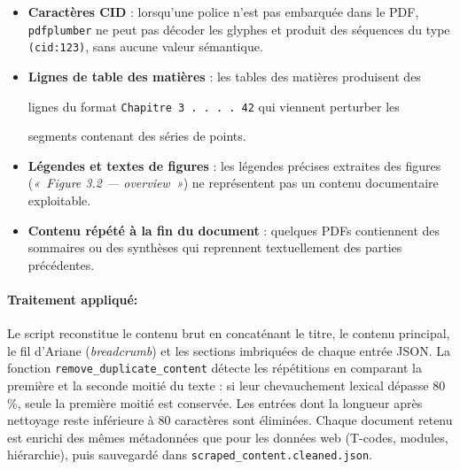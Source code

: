 \begin{tcolorbox}[
  enhanced, breakable,
  colback       = red!3!white,
  colframe      = red!38!black,
  colbacktitle  = red!38!black,
  coltitle      = white,
  fonttitle     = \small\bfseries\sffamily,
  title         = {Problèmes identifiés},
  arc           = 5pt,
  boxrule       = 0.75pt,
  toptitle      = 3.5pt, bottomtitle = 3.5pt,
  left = 8pt, right = 8pt, top = 6pt, bottom = 6pt,
]
\begin{itemize}[
  leftmargin = *,
  label      = {\textcolor{red!45!black}{\small$\blacktriangleright$}},
  itemsep    = 6pt,
  topsep     = 0pt,
  parsep     = 0pt
]

  \item {}\enspace
    \textbf{Caractères CID} : lorsqu'une police n'est pas embarquée dans le PDF,
    \texttt{pdfplumber} ne peut pas décoder les glyphes et produit des séquences
    du type \texttt{(cid:123)}, sans aucune valeur sémantique.

  \item {}\enspace
  \textbf{Lignes de table des matières} : les tables des matières produisent des

    lignes du format \texttt{Chapitre\,3\,.\,.\,.\,.\,42} qui viennent perturber les

    segments contenant des séries de points.

  \item {}\enspace
    \textbf{Légendes et textes de figures} : les légendes précises extraites des figures (\textit{«~Figure 3.2 --- overview~»}) ne représentent pas un contenu documentaire exploitable.

  \item {}\enspace
\textbf{Contenu répété à la fin du document} : quelques PDFs contiennent des sommaires ou des synthèses qui reprennent textuellement des parties précédentes.

\end{itemize}
\end{tcolorbox}

\paragraph{Traitement appliqué:}

Le script reconstitue le contenu brut en concaténant le titre, le contenu principal, le fil d’Ariane (\textit{breadcrumb}) et les sections imbriquées de chaque entrée JSON. La fonction \texttt{remove\_duplicate\_content} détecte les répétitions en comparant la première et la seconde moitié du texte : si leur chevauchement lexical dépasse 80\,\%, seule la première moitié est conservée. Les entrées dont la longueur après nettoyage reste inférieure à 80 caractères sont éliminées. Chaque document retenu est enrichi des mêmes métadonnées que pour les données web (T-codes, modules, hiérarchie), puis sauvegardé dans \texttt{scraped\_content.cleaned.json}.

